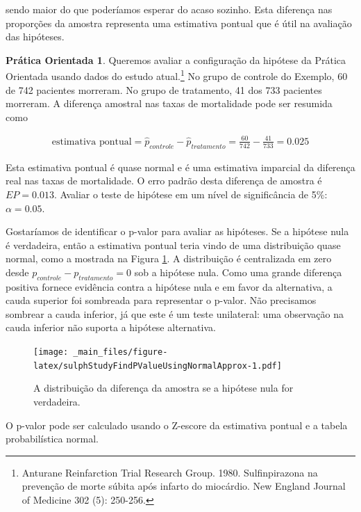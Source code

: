 \documentclass[
]{book}
\theoremstyle{definition}
\theoremstyle{definition}
\theoremstyle{definition}
\newtheorem{exercise}{Prática Orientada}[chapter]
\theoremstyle{definition}
\theoremstyle{remark}
\begin{document}
sendo maior do que poderíamos esperar do acaso sozinho. Esta diferença nas proporções da amostra representa uma estimativa pontual que é útil na avaliação das hipóteses.

\begin{exercise}
\protect\hypertarget{exr:unnamed-chunk-185}{}{\label{exr:unnamed-chunk-185} }Queremos avaliar a configuração da hipótese da Prática Orientada usando dados do estudo atual.\footnote{Anturane Reinfarction Trial Research Group. 1980. Sulfinpirazona na prevenção de morte súbita após infarto do miocárdio. New England Journal of Medicine 302 (5): 250-256.} No grupo de controle do Exemplo, 60 de 742 pacientes morreram. No grupo de tratamento, 41 dos 733 pacientes morreram. A diferença amostral nas taxas de mortalidade pode ser resumida como

\begin{eqnarray*}
\text{estimativa pontual} = \hat{p}_{controle} - \hat{p}_{tratamento} = \frac{60}{742} - \frac{41}{733} = 0.025
\end{eqnarray*}

Esta estimativa pontual é quase normal e é uma estimativa imparcial da diferença real nas taxas de mortalidade. O erro padrão desta diferença de amostra é \(EP = 0.013\). Avaliar o teste de hipótese em um nível de significância de 5\%: \(\alpha=0.05\).

Gostaríamos de identificar o p-valor para avaliar as hipóteses. Se a hipótese nula é verdadeira, então a estimativa pontual teria vindo de uma distribuição quase normal, como a mostrada na Figura \ref{fig:sulphStudyFindPValueUsingNormalApprox}. A distribuição é centralizada em zero desde \(p_{controle}-p_{tratamento}=0\) sob a hipótese nula. Como uma grande diferença positiva fornece evidência contra a hipótese nula e em favor da alternativa, a cauda superior foi sombreada para representar o p-valor. Não precisamos sombrear a cauda inferior, já que este é um teste unilateral: uma observação na cauda inferior não suporta a hipótese alternativa.
\end{exercise}

\begin{figure}
\centering
\texttt{[image: \_main\_files/figure-latex/sulphStudyFindPValueUsingNormalApprox-1.pdf]}
\caption{\label{fig:sulphStudyFindPValueUsingNormalApprox}A distribuição da diferença da amostra se a hipótese nula for verdadeira.}
\end{figure}

O p-valor pode ser calculado usando o Z-escore da estimativa pontual e a tabela probabilística normal.
\end{document}
